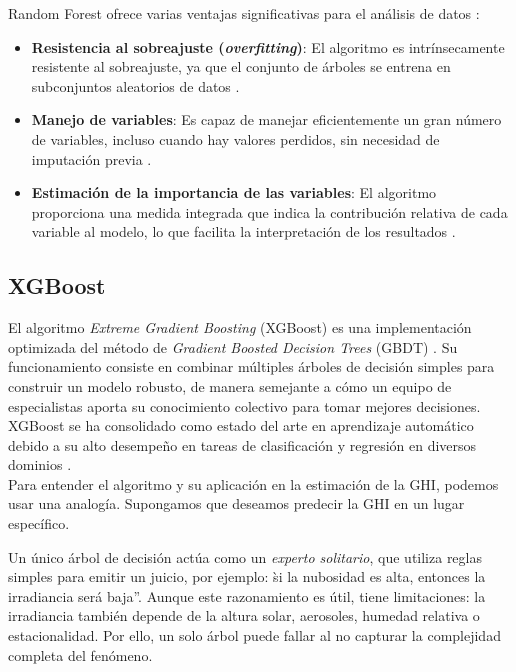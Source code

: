 Random Forest ofrece varias ventajas significativas para el an\'alisis de datos \cite{cutler2011}:

\begin{itemize}
    \item \textbf{Resistencia al sobreajuste (\textit{overfitting})}: El algoritmo es intr\'insecamente resistente al sobreajuste, ya que el conjunto de \'arboles se entrena en subconjuntos aleatorios de datos \cite{salman2024}.
    \item \textbf{Manejo de variables}: Es capaz de manejar eficientemente un gran n\'umero de variables, incluso cuando hay valores perdidos, sin necesidad de imputaci\'on previa \cite{cutler2011}.
    \item \textbf{Estimaci\'on de la importancia de las variables}: El algoritmo proporciona una medida integrada que indica la contribuci\'on relativa de cada variable al modelo, lo que facilita la interpretaci\'on de los resultados \cite{cutler2011}.
\end{itemize}



\subsection{XGBoost}

El algoritmo \textit{Extreme Gradient Boosting} (XGBoost) es una implementación optimizada del método de \textit{Gradient Boosted Decision Trees} (GBDT) \cite{chen2016xgboost}.
Su funcionamiento consiste en combinar múltiples árboles de decisión simples para construir un modelo robusto, de manera semejante a cómo un equipo de especialistas aporta su conocimiento colectivo para tomar mejores decisiones.
XGBoost se ha consolidado como estado del arte en aprendizaje automático debido a su alto desempeño en tareas de clasificación y regresión en diversos dominios \cite{espinoza2020aplicacion}.\\


Para entender el algoritmo y su aplicación en la estimación de la GHI, podemos usar una analogía. Supongamos que deseamos predecir la GHI en un lugar específico.

Un único árbol de decisión actúa como un \textit{experto solitario}, que utiliza reglas simples para emitir un juicio, por ejemplo: \`si la nubosidad es alta, entonces la irradiancia será baja''. Aunque este razonamiento es útil, tiene limitaciones: la irradiancia también depende de la altura solar, aerosoles, humedad relativa o estacionalidad. Por ello, un solo árbol puede fallar al no capturar la complejidad completa del fenómeno.

